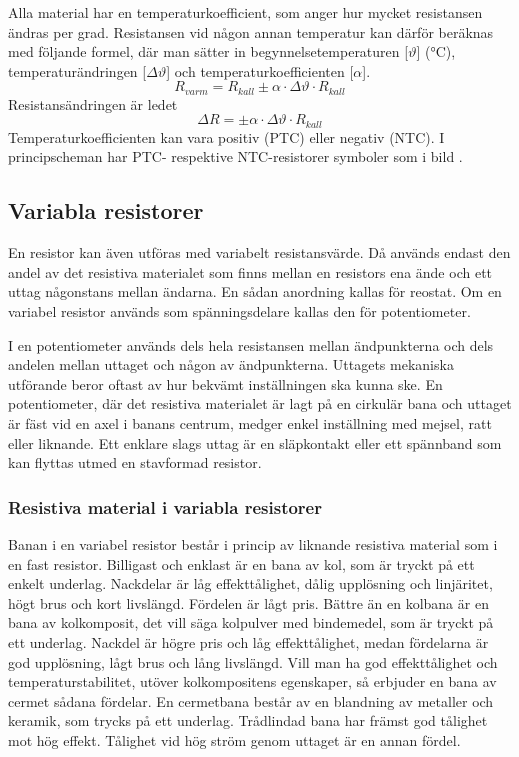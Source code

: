 Alla material har en temperaturkoefficient, som anger hur mycket resistansen
ändras per grad. Resistansen vid någon annan temperatur kan därför beräknas med
följande formel, där man sätter in begynnelsetemperaturen [\(\vartheta\)]
(\si{\degreeCelsius}), temperaturändringen [\(\Delta \vartheta\)] och
temperaturkoefficienten [\(\alpha\)].
\[R_{varm} = R_{kall} \pm \alpha \cdot \Delta \vartheta \cdot R_{kall}\]
Resistansändringen är ledet
\[ \Delta R = \pm \alpha \cdot \Delta \vartheta \cdot R_{kall}\]
Temperaturkoefficienten kan vara positiv (PTC) eller negativ (NTC).
I principscheman har PTC- respektive NTC-resistorer symboler som i bild .


\subsection{Variabla resistorer}

En resistor kan även utföras med variabelt resistansvärde. Då används endast
den andel av det resistiva materialet som finns mellan en resistors ena ände
och ett uttag någonstans mellan ändarna. En sådan anordning kallas för reostat.
Om en variabel resistor används som spänningsdelare kallas den för
potentiometer.

I en potentiometer används dels hela resistansen mellan ändpunkterna och dels
andelen mellan uttaget och någon av ändpunkterna. Uttagets mekaniska utförande
beror oftast av hur bekvämt inställningen ska kunna ske. En potentiometer,
där det resistiva materialet är lagt på en cirkulär bana och uttaget är fäst
vid en axel i banans centrum, medger enkel inställning med mejsel, ratt eller liknande.
Ett enklare slags uttag är en släpkontakt eller ett spännband som kan flyttas
utmed en stavformad resistor.

\subsubsection{Resistiva material i variabla resistorer}

Banan i en variabel resistor består i princip av liknande resistiva material som
i en fast resistor.
Billigast och enklast är en bana av kol, som är tryckt på ett enkelt underlag.
Nackdelar är låg effekttålighet, dålig upplösning och linjäritet, högt brus och
kort livslängd. Fördelen är lågt pris.
Bättre än en kolbana är en bana av kolkomposit, det vill säga kolpulver med
bindemedel, som är tryckt på ett underlag.
Nackdel är högre pris och låg effekttålighet, medan fördelarna är god
upplösning, lågt brus och lång livslängd.
Vill man ha god effekttålighet och temperaturstabilitet, utöver kolkompositens
egenskaper, så erbjuder en bana av cermet sådana fördelar.
En cermetbana består av en blandning av metaller och keramik, som trycks på ett
underlag.
Trådlindad bana har främst god tålighet mot hög effekt.
Tålighet vid hög ström genom uttaget är en annan fördel.


